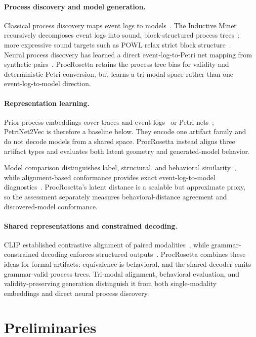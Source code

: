 \documentclass[manuscript,screen,nonacm]{acmart}
\begin{document}
\paragraph{Process discovery and model generation.}
Classical process discovery maps event logs to models~\cite{Aalst2004}. The Inductive Miner recursively decomposes event logs into sound, block-structured process trees~\cite{Leemans2013}; more expressive sound targets such as POWL relax strict block structure~\cite{Kourani2026}. Neural process discovery has learned a direct event-log-to-Petri net mapping from synthetic pairs~\cite{Sommers2023}. ProcRosetta retains the process tree bias for validity and deterministic Petri conversion, but learns a tri-modal space rather than one event-log-to-model direction.

\paragraph{Representation learning.}
Prior process embeddings cover traces and event logs~\cite{DeKoninck2018,Barbon2023} or Petri nets~\cite{Colonna2024}; PetriNet2Vec is therefore a baseline below. They encode one artifact family and do not decode models from a shared space. ProcRosetta instead aligns three artifact types and evaluates both latent geometry and generated-model behavior.

Model comparison distinguishes label, structural, and behavioral similarity~\cite{Dijkman2011}, while alignment-based conformance provides exact event-log-to-model diagnostics~\cite{Adriansyah2013}. ProcRosetta's latent distance is a scalable but approximate proxy, so the assessment separately measures behavioral-distance agreement and discovered-model conformance.

\paragraph{Shared representations and constrained decoding.}
CLIP established contrastive alignment of paired modalities~\cite{Radford2021}, while grammar-constrained decoding enforces structured outputs~\cite{Geng2023}. ProcRosetta combines these ideas for formal artifacts: equivalence is behavioral, and the shared decoder emits grammar-valid process trees. Tri-modal alignment, behavioral evaluation, and validity-preserving generation distinguish it from both single-modality embeddings and direct neural process discovery.

\section{Preliminaries}
\label{sec:preliminaries}
\end{document}
